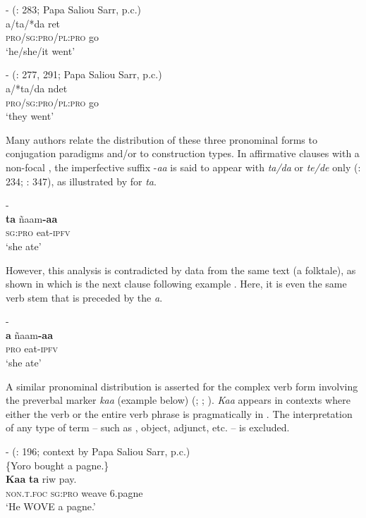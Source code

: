 \documentclass[output=paper
,newtxmath
,modfonts
,nonflat]{langsci/langscibook}
\begin{document}
\ea\label{ex:apel:4}
\ea\label{ex:apel:4a}- (\citealt{Faye1979}: 283; Papa Saliou Sarr, p.c.)\\
\gll a/ta/*da ret\\
     \textsc{pro/sg:pro/pl:pro} go \\
\glt ‘he/she/it went’ 

\ex\label{ex:apel:4b}{- (\citealt{Faye1979}: 277, 291; Papa Saliou Sarr, p.c.)}\\
\gll a/*ta/da ndet \\
     \textsc{pro/sg:pro/pl:pro} go  \\
\glt ‘they went’
\z
\z

Many authors relate the distribution of these three pronominal forms to conjugation paradigms and/or to construction types. In affirmative clauses with a non-focal , the imperfective suffix -\textit{aa} is said to appear with \textit{ta/da} or \textit{te/de} only (\citealt{Faye1979}: 234; \citealt{Renaudier2012}: 347), as illustrated by  for \textit{ta}.

\ea\label{ex:apel:5}{- \citep[283]{Faye1979}}\\
\gll \textbf{ta} ñaam\textbf{-aa}\\
     \textsc{sg:pro} eat\textsc{-ipfv}\\
\glt ‘she ate’
\z

However, this analysis is contradicted by data from the same text (a folktale), as shown in  which is the next clause following example . Here, it is even the same verb stem that is preceded by the  \textit{a}.
\pagebreak

\ea\label{ex:apel:6}{- \citep[283]{Faye1979}}\\
\gll \textbf{a} ñaam\textbf{-aa}\\
     \textsc{pro} eat\textsc{-ipfv}\\
\glt ‘she ate’
\z

A similar pronominal distribution is asserted for the complex verb form involving the preverbal marker \textit{kaa} (example  below) (\citealt[234]{Faye1979}; \citealt[91f]{FayeMous06}; \citealt[348]{Renaudier2012}). \textit{Kaa} appears in contexts where either the verb or the entire verb phrase is pragmatically in . The interpretation of any type of term  -- such as , object, adjunct, etc. -- is excluded.

\ea\label{ex:apel:7}{- (\citealt{Faye1979}: 196; context by Papa Saliou Sarr,   p.c.)}\\
{\-\hspace{0cm}\{Yoro bought a pagne.\}}\\
\gll   \textbf{Kaa} \textbf{ta} riw pay.\\
     \textsc{non.t.foc} \textsc{sg:pro} weave \textsc{6.}pagne\\
\glt ‘He WOVE a pagne.’ 
\z
\end{document}
